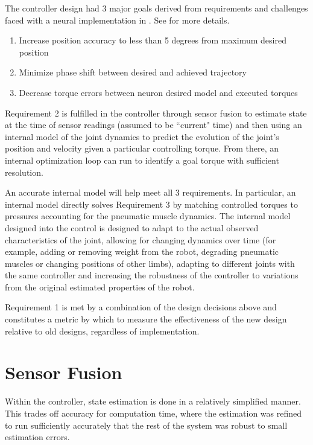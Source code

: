 The controller design had 3 major goals derived from
requirements and challenges faced with a neural implementation in
\cite{HuntPhDThesis}. See  for more details.

\begin{enumerate}
\item Increase position accuracy to less than 5 degrees from maximum desired
position
\item Minimize phase shift between desired and achieved trajectory
\item Decrease torque errors between neuron desired model and executed torques
\end{enumerate}

Requirement 2 is fulfilled in
the controller through sensor fusion to estimate state at the time of sensor
readings (assumed to be ``current" time) and then using an internal model of the
joint dynamics to predict the evolution of the joint's position and velocity
given a particular controlling torque. From there, an internal optimization loop
can run to identify a goal torque with sufficient resolution.

An accurate internal model will help meet all 3 requirements. In particular, an
internal model directly solves Requirement 3 by matching controlled torques to
pressures accounting for the pneumatic muscle dynamics. The internal model
designed into the control is designed to adapt to the actual observed
characteristics of the joint, allowing for changing dynamics over time (for
example, adding or removing weight from the robot, degrading pneumatic muscles
or changing positions of other limbs),
adapting to different joints with the same controller and increasing the
robustness of the controller to variations from the original estimated
properties of the robot.

Requirement 1 is met by a combination of the design decisions above and
constitutes a metric by which to measure the effectiveness of the new design
relative to old designs, regardless of implementation.

\section{Sensor Fusion}

Within the controller, state estimation is done in a relatively simplified
manner. This trades off accuracy for computation time, where the estimation was
refined to run sufficiently accurately that the rest of the system was robust to
small estimation errors.

